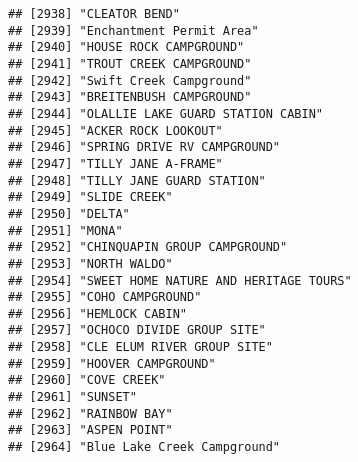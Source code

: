 \documentclass[
]{article}
\begin{document}
\begin{verbatim}
## [2938] "CLEATOR BEND"                                                                        
## [2939] "Enchantment Permit Area"                                                             
## [2940] "HOUSE ROCK CAMPGROUND"                                                               
## [2941] "TROUT CREEK CAMPGROUND"                                                              
## [2942] "Swift Creek Campground"                                                              
## [2943] "BREITENBUSH CAMPGROUND"                                                              
## [2944] "OLALLIE LAKE GUARD STATION CABIN"                                                    
## [2945] "ACKER ROCK LOOKOUT"                                                                  
## [2946] "SPRING DRIVE RV CAMPGROUND"                                                          
## [2947] "TILLY JANE A-FRAME"                                                                  
## [2948] "TILLY JANE GUARD STATION"                                                            
## [2949] "SLIDE CREEK"                                                                         
## [2950] "DELTA"                                                                               
## [2951] "MONA"                                                                                
## [2952] "CHINQUAPIN GROUP CAMPGROUND"                                                         
## [2953] "NORTH WALDO"                                                                         
## [2954] "SWEET HOME NATURE AND HERITAGE TOURS"                                                
## [2955] "COHO CAMPGROUND"                                                                     
## [2956] "HEMLOCK CABIN"                                                                       
## [2957] "OCHOCO DIVIDE GROUP SITE"                                                            
## [2958] "CLE ELUM RIVER GROUP SITE"                                                           
## [2959] "HOOVER CAMPGROUND"                                                                   
## [2960] "COVE CREEK"                                                                          
## [2961] "SUNSET"                                                                              
## [2962] "RAINBOW BAY"                                                                         
## [2963] "ASPEN POINT"                                                                         
## [2964] "Blue Lake Creek Campground"                                                          

\end{verbatim}
\end{document}
